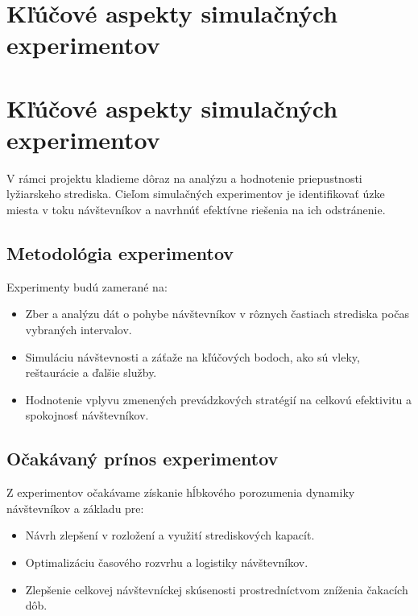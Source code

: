 ﻿\section{ Kľúčové aspekty simulačných experimentov }

\section{Kľúčové aspekty simulačných experimentov}

V rámci projektu kladieme dôraz na analýzu a hodnotenie priepustnosti lyžiarskeho strediska. Cieľom simulačných experimentov je 
identifikovať úzke miesta v toku návštevníkov a navrhnúť efektívne riešenia na ich odstránenie.

\subsection{Metodológia experimentov}

Experimenty budú zamerané na:
\begin{itemize}
  \item Zber a analýzu dát o pohybe návštevníkov v rôznych častiach strediska počas vybraných intervalov.
  \item Simuláciu návštevnosti a záťaže na kľúčových bodoch, ako sú vleky, reštaurácie a ďalšie služby.
  \item Hodnotenie vplyvu zmenených prevádzkových stratégií na celkovú efektivitu a spokojnosť návštevníkov.
\end{itemize}

\subsection{Očakávaný prínos experimentov}

Z experimentov očakávame získanie hĺbkového porozumenia dynamiky návštevníkov a základu pre:
\begin{itemize}
  \item Návrh zlepšení v rozložení a využití strediskových kapacít.
  \item Optimalizáciu časového rozvrhu a logistiky návštevníkov.
  \item Zlepšenie celkovej návštevníckej skúsenosti prostredníctvom zníženia čakacích dôb.
\end{itemize}
